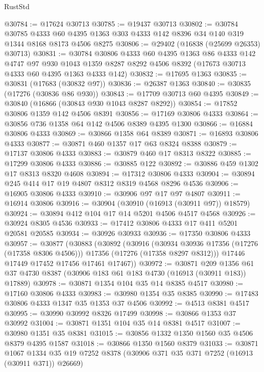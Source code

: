 \begin{lexlean}{RustStd}
\begin{coremodule}
@30784 := @17624 @30713
@30785 := @19437 @30713
@30802 := @30784
    @30785
    @4333
    @60
    @4395
    @1363
    @303
    @4333
    @142
    @8396
    @34
    @140
    @319
    @1344
    @8168
    @8173
    @4506
    @8275
@30806 := @29402 (@16838 (@25699 @26353) @30713)
@30831 := @30784
    @30806
    @4333
    @60
    @4395
    @1363
    @86
    @4333
    @142
    @4747
    @97
    @930
    @1043
    @1359
    @8287
    @8292
    @4506
    @8392
    (@17673 @30713 @4333 @60 @4395 @1363 @4333 @142)
@30832 := @17695 @1363
@30835 := @30831 (@17683 (@30832 @97))
@30836 := @26387 @1363
@30840 := @30835 (@17276 (@30836 @86 @930))
@30843 := @17709 @30713 @60 @4395
@30849 := @30840 (@16866 (@30843 @930 @1043 @8287 @8292))
@30854 := @17852 @30806 @1359 @142 @4506 @8391
@30856 := @17169 @30806 @4333
@30864 := @30856 @736 @1358 @64 @142 @4506 @8389 @4395 @1300
@30866 := @16884 @30806 @4333
@30869 := @30866 @1358 @64 @8389
@30871 := @16893 @30806 @4333
@30877 := @30871 @460 @1357 @17 @63 @8324 @8388
@30879 := @17137 @30806 @4333
@30883 := @30879 @460 @17 @8313 @8322
@30885 := @17299 @30806 @4333
@30886 := @30885 @122
@30892 := @30886 @459 @1302 @17 @8313 @8320 @4608
@30894 := @17312 @30806 @4333
@30904 := @30894 @245 @414 @17 @19 @4807 @8312 @8319 @4568 @8296 @4536
@30906 := @16905 @30806 @4333
@30910 := @30906 @97 @17 @97 @4807
@30911 := @16914 @30806
@30916 := @30904 (@30910 (@16913 (@30911 @97)) @18579)
@30924 := @30894 @412 @104 @17 @14 @5201 @4506 @4517 @4568
@30926 := @30924 @8305 @4536
@30933 := @17412 @30806 @4333 @17 @411 @5201 @20581 @20585
@30934 := @30926 @30933
@30936 := @17350 @30806 @4333
@30957 := @30877
    (@30883
      (@30892
        (@30916
          (@30934 @30936 @17356 (@17276 (@17358 @8306 @4506)))
          @17356
          (@17276 (@17358 @8297 @8312)))
        @17446
        @17449
        @17452
        @17456
        @17461
        @17467))
@30972 := @30871
    @209
    @1356
    @61
    @37
    @4730
    @8387
    (@30906 @183 @61 @183 @4730 (@16913 (@30911 @183)) @17889)
@30978 := @30871 @1354 @104 @35 @14 @8385 @4517
@30980 := @17160 @30806 @4333
@30983 := @30980 @1354 @35 @8385
@30990 := @17483 @30806 @4333 @1347 @35 @1353 @37 @4506
@30992 := @4513 @8381 @4517
@30995 := @30990 @30992 @8326 @17499
@30998 := @30866 @1353 @37 @30992
@31004 := @30871 @1351 @104 @35 @14 @8381 @4517
@31007 := @30980 @1351 @35 @8381
@31015 := @30856 @1332 @1350 @1560 @35 @4506 @8379 @4395 @1587
@31018 := @30866 @1350 @1560 @8379
@31033 := @30871
    @1067
    @1334
    @35
    @19
    @7252
    @8378
    (@30906 @371 @35 @371 @7252 (@16913 (@30911 @371)) @26669)

\end{coremodule}
\end{lexlean}
